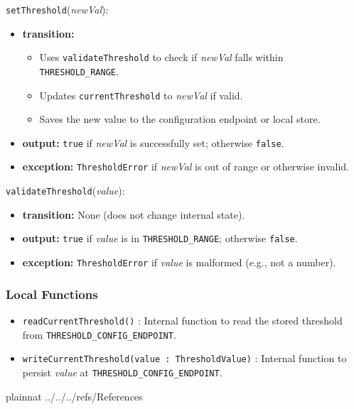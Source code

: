 \documentclass[12pt, titlepage]{article}
\begin{document}
\noindent \texttt{setThreshold}(\textit{newVal}):
\begin{itemize}
    \item \textbf{transition:}
    \begin{itemize}
        \item Uses \texttt{validateThreshold} to check if \textit{newVal} falls within \texttt{THRESHOLD\_RANGE}.
        \item Updates \texttt{currentThreshold} to \textit{newVal} if valid.
        \item Saves the new value to the configuration endpoint or local store.
    \end{itemize}
    \item \textbf{output:} \texttt{true} if \textit{newVal} is successfully set; otherwise \texttt{false}.
    \item \textbf{exception:} \texttt{ThresholdError} if \textit{newVal} is out of range or otherwise invalid.
\end{itemize}

\noindent \texttt{validateThreshold}(\textit{value}):
\begin{itemize}
    \item \textbf{transition:} None (does not change internal state).
    \item \textbf{output:} \texttt{true} if \textit{value} is in \texttt{THRESHOLD\_RANGE}; otherwise \texttt{false}.
    \item \textbf{exception:} \texttt{ThresholdError} if \textit{value} is malformed (e.g., not a number).
\end{itemize}

\subsubsection{Local Functions}

\begin{itemize}
    \item \texttt{readCurrentThreshold()} : Internal function to read the stored threshold from \texttt{THRESHOLD\_CONFIG\_ENDPOINT}.
    \item \texttt{writeCurrentThreshold(value : ThresholdValue)} : Internal function to persist \textit{value} at \texttt{THRESHOLD\_CONFIG\_ENDPOINT}.
\end{itemize}

\newpage

 {plainnat}
 {../../../refs/References}
\end{document}
